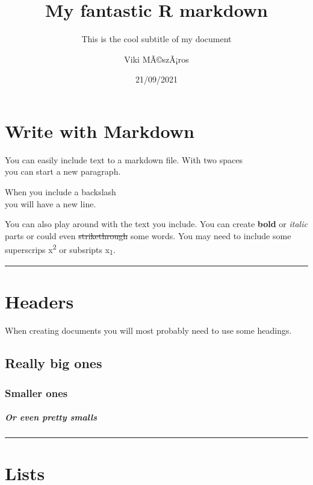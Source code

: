 \documentclass[]{article}
\title{My fantastic R markdown}
\subtitle{This is the cool subtitle of my document}
\author{Viki MÃ©szÃ¡ros}
\date{21/09/2021}
\let\oldsubparagraph\subparagraph
\renewcommand{\subparagraph}[1]{\oldsubparagraph{#1}\mbox{}}
\begin{document}
\maketitle

{
\setcounter{tocdepth}{2}
\tableofcontents
}
\hypertarget{write-with-markdown}{%
\section{Write with Markdown}\label{write-with-markdown}}

You can easily include text to a markdown file. With two spaces\\
you can start a new paragraph.

When you include a backslash\\
you will have a new line.

You can also play around with the text you include. You can create
\textbf{bold} or \emph{italic} parts or could even \sout{strikethrough}
some words. You may need to include some superscrips
x\textsuperscript{2} or subsripts x\textsubscript{1}.

\begin{center}\rule{0.5\linewidth}{0.5pt}\end{center}

\hypertarget{headers}{%
\section{Headers}\label{headers}}

When creating documents you will most probably need to use some
headings.

\hypertarget{really-big-ones}{%
\subsection{Really big ones}\label{really-big-ones}}

\hypertarget{smaller-ones}{%
\subsubsection{Smaller ones}\label{smaller-ones}}

\hypertarget{or-even-pretty-smalls}{%
\subparagraph{Or even pretty smalls}\label{or-even-pretty-smalls}}

\begin{center}\rule{0.5\linewidth}{0.5pt}\end{center}

\hypertarget{lists}{%
\section{Lists}\label{lists}}
\end{document}
